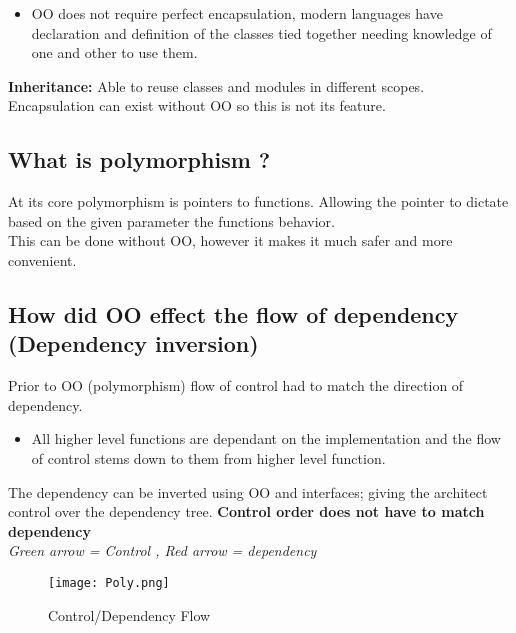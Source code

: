 \documentclass[11pt]{scrartcl} %
\begin{document}
\begin{itemize}
\item
  OO does not require perfect encapsulation, modern languages have
  declaration and definition of the classes tied together needing
  knowledge of one and other to use them.
\end{itemize}

\textbf{Inheritance:} Able to reuse classes and modules in different
scopes.\\

Encapsulation can exist without OO so this is not its feature.

\subsection{What is polymorphism ?}

At its core polymorphism is pointers to functions. Allowing the pointer
to dictate based on the given parameter the functions behavior.\\

This can be done without OO, however it makes it much safer and more
convenient.

\subsection{How did OO effect the flow of dependency (Dependency
inversion)}

Prior to OO (polymorphism) flow of control had to match the direction of dependency.

\begin{itemize}
\item
  All higher level functions are dependant on the implementation and the flow of
  control stems down to them from higher level function.
\end{itemize}

The dependency can be inverted using OO and interfaces; giving the
architect control over the dependency tree. \textbf{Control order does
not have to match dependency}\\

\emph{Green arrow = Control , Red arrow = dependency}

\begin{figure}[h] %
	\centering
	\texttt{[image: Poly.png]} %
	\caption{Control/Dependency Flow}
\end{figure}
\end{document}
